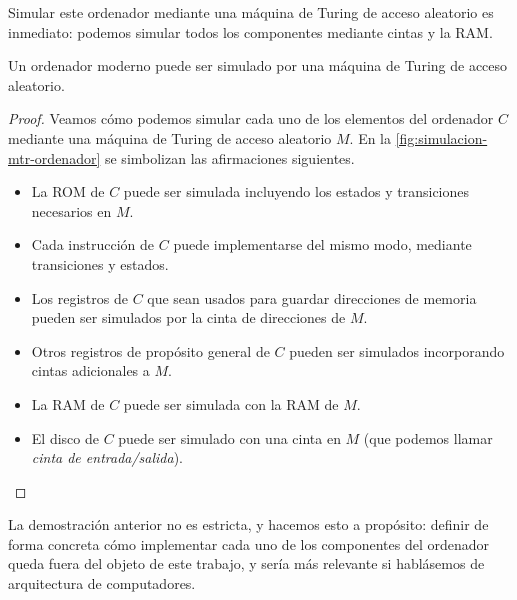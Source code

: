 Simular este ordenador mediante una máquina de Turing de acceso aleatorio es inmediato: podemos simular todos los componentes mediante cintas y la RAM.

\begin{proposicion}\label{prop:aleatorio-a-ordenador}
Un ordenador moderno puede ser simulado por una máquina de Turing de acceso aleatorio.
\end{proposicion}
\begin{proof}
Veamos cómo podemos simular cada uno de los elementos del ordenador $C$ mediante una máquina de Turing de acceso aleatorio $M$. En la \cref{fig:simulacion-mtr-ordenador} se simbolizan las afirmaciones siguientes.
\begin{itemize}
    \item La ROM de $C$ puede ser simulada incluyendo los estados y transiciones necesarios en $M$.
    \item Cada instrucción de $C$ puede implementarse del mismo modo, mediante transiciones y estados.
    \item Los registros de $C$ que sean usados para guardar direcciones de memoria pueden ser simulados por la cinta de direcciones de $M$.
    \item Otros registros de propósito general de $C$ pueden ser simulados incorporando cintas adicionales a $M$.
    \item La RAM de $C$ puede ser simulada con la RAM de $M$.
    \item El disco de $C$ puede ser simulado con una cinta en $M$ (que podemos llamar \emph{cinta de entrada/salida}).
\end{itemize}
\end{proof}

La demostración anterior no es estricta, y hacemos esto a propósito: definir de forma concreta cómo implementar cada uno de los componentes del ordenador queda fuera del objeto de este trabajo, y sería más relevante si hablásemos de arquitectura de computadores.

